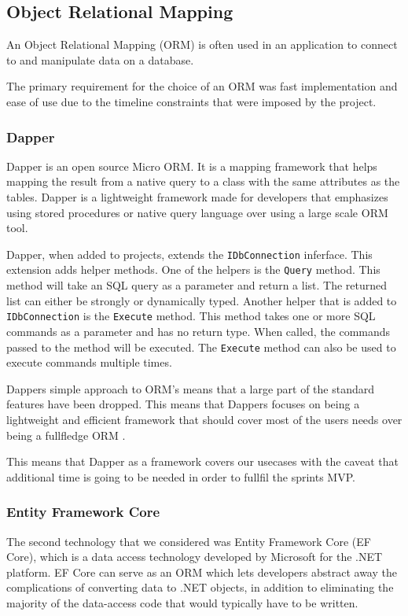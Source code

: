 \subsection{Object Relational Mapping}
An Object Relational Mapping (ORM) is often used in an application to connect to and manipulate data on a database.

The primary requirement for the choice of an ORM was fast implementation and ease of use due to the timeline constraints that were imposed by the \knox{} project. 

\subsubsection{Dapper}
Dapper is an open source Micro ORM. It is a mapping framework that helps mapping the result from a native query to a class with the same attributes as the tables. Dapper is a lightweight framework made for developers that emphasizes using stored procedures or native query language over using a large scale ORM tool. 


Dapper, when added to projects, extends the \texttt{IDbConnection} inferface. This extension adds helper methods. 
One of the helpers is the \texttt{Query} method. This method will take an SQL query as a parameter and return a list. The returned list can either be strongly or dynamically typed.
Another helper that is added to \texttt{IDbConnection} is the \texttt{Execute} method. This method takes one or more SQL commands as a parameter and has no return type. When called, the commands passed to the method will be executed. The \texttt{Execute} method can also be used to execute commands multiple times\cite{Dapper_Git}.

Dappers simple approach to ORM's means that a large part of the standard features have been dropped. This means that Dappers focuses on being a lightweight and efficient framework that should cover most of the users needs over being a fullfledge ORM \cite{Dapper_Git}.

This means that Dapper as a framework covers our usecases with the caveat that additional time is going to be needed in order to fullfil the sprints MVP. 

\subsubsection{Entity Framework Core}
The second technology that we considered was Entity Framework Core (EF Core), which is a data access technology developed by Microsoft for the .NET platform. EF Core can serve as an ORM \cite{Object_relational_mapping} which lets developers abstract away the complications of converting data to .NET objects, in addition to eliminating the majority of the data-access code that would typically have to be written.

